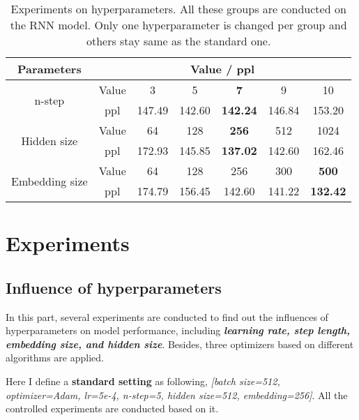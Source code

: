 \documentclass[11pt,a4paper]{article}
\begin{document}
\begin{table*}[t]
\centering
\begin{tabular}{ccccccc} 
\hline
Parameters                        & \multicolumn{6}{c}{Value / ppl}                \\ 
\hline
\multirow{2}{*}{n-step}           & Value & 3      & 5      & \textbf{7}      & 9      & 10     \\
                                  & ppl   & 147.49 & 142.60 & \textbf{142.24} & 146.84 & 153.20 \\
\multirow{2}{*}{Hidden size}      & Value & 64     & 128    & \textbf{256}    & 512    & 1024   \\
                                  & ppl   & 172.93 & 145.85 & \textbf{137.02} & 142.60 & 162.46 \\
\multirow{2}{*}{Embedding size}   & Value & 64     & 128    & 256    & 300    & \textbf{500}    \\
                                  & ppl   & 174.79 & 156.45 & 142.60 & 141.22 & \textbf{132.42} \\
\hline
\end{tabular}
\caption{\label{hyperpara-table} Experiments on hyperparameters. All these groups are conducted on the RNN model. Only one hyperparameter is changed per group and others stay same as the standard one.}
\end{table*}


\section{Experiments}

\subsection{Influence of hyperparameters}
In this part, several experiments are conducted to find out the influences of hyperparameters on model performance, including \textbf{\emph{learning rate, step length, embedding size, and hidden size}}. Besides, three optimizers based on different algorithms are applied.

Here I define a \textbf{standard setting} as following,
\emph{[batch size=512, optimizer=Adam, lr=5e-4, n-step=5, hidden size=512, embedding=256]}.
All the controlled experiments are conducted based on it.
\end{document}
